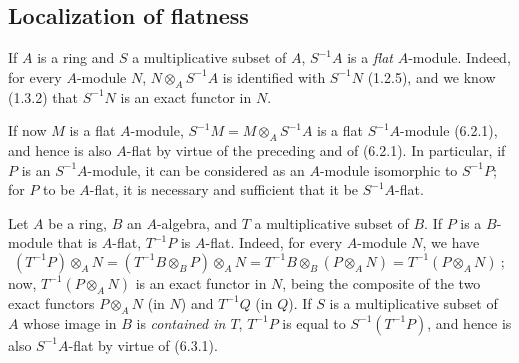 \subsection{Localization of flatness}
\label{subsection:0.6.3}

\begin{env}[6.3.1]
\label{0.6.3.1}
If $A$ is a ring and $S$ a multiplicative subset of $A$, $S^{-1}A$ is
a \emph{flat} $A$-module. Indeed, for every $A$-module $N$,
$N\otimes_A S^{-1}A$ is identified with $S^{-1}N$ (1.2.5), and we know (1.3.2)
that $S^{-1}N$ is an exact functor in $N$.

If now $M$ is a flat $A$-module,
$S^{-1}M=M\otimes_A S^{-1}A$ is a flat $S^{-1}A$-module (6.2.1), and hence
is also $A$-flat by virtue of the preceding and of (6.2.1). In particular,
if $P$ is an $S^{-1}A$-module, it can be considered as an $A$-module
isomorphic to $S^{-1}P$; for $P$ to be $A$-flat, it is necessary and sufficient
that it be $S^{-1}A$-flat.
\end{env}

\begin{env}[6.3.2]
\label{0.6.3.2}
Let $A$ be a ring, $B$ an $A$-algebra, and $T$ a multiplicative subset of
$B$. If $P$ is a $B$-module that is $A$-flat, $T^{-1}P$ is $A$-flat.
Indeed, for every $A$-module $N$, we have
\[
  (T^{-1}P)\otimes_A N
  =(T^{-1}B\otimes_B P)\otimes_A N
  =T^{-1}B\otimes_B(P\otimes_A N)
  =T^{-1}(P\otimes_A N)~;
\]
now, $T^{-1}(P\otimes_A N)$ is an exact functor in $N$, being the composite of the
two exact functors $P\otimes_A N$ (in $N$) and $T^{-1}Q$ (in $Q$). If $S$
is a multiplicative subset of $A$ whose image in $B$ is
\emph{contained in $T$}, $T^{-1}P$ is equal to $S^{-1}(T^{-1}P)$, and hence is
also $S^{-1}A$-flat by virtue of (6.3.1).
\end{env}

